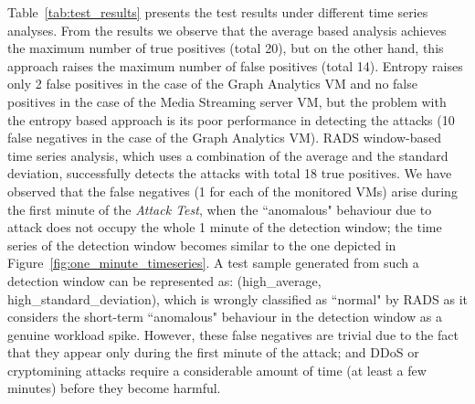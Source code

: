 Table~\ref{tab:test_results} presents the test results under different time series analyses.
From the results we observe 
that the average based analysis achieves the maximum number of true positives (total 20), but on the other hand, this approach raises the maximum number of false positives (total 14).
Entropy raises only 2 false positives in the case of the Graph Analytics VM and no false positives in the case of the Media Streaming server VM, but the problem with the entropy based approach is its poor performance in detecting the attacks (10 false negatives in the case of the Graph Analytics VM).
RADS window-based time series analysis, which uses a combination of the average and the standard deviation, successfully detects the attacks with total 18 true positives. 
We have observed that the false negatives (1 for each of the monitored VMs) arise during the first minute of the \textit{Attack Test}, when the ``anomalous" behaviour due to attack does not occupy the whole 1 minute of the detection window; the time series of the detection window becomes similar to the one depicted in Figure~\ref{fig:one_minute_timeseries}. A test sample generated from such a detection window can be represented as: (high\_average, high\_standard\_deviation), which is wrongly classified as ``normal" by RADS as it considers the short-term ``anomalous" behaviour in the detection window as a genuine workload spike.
However, these false negatives are trivial due to the fact that they appear only during the first minute of the attack; and DDoS or cryptomining attacks require a considerable amount of time (at least a few minutes) before they become harmful.  

